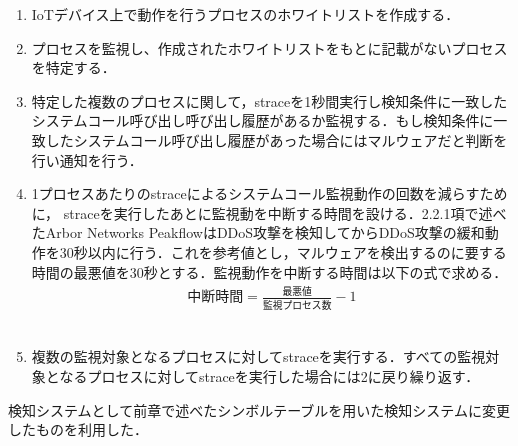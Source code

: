 \begin{enumerate}
 \item IoTデバイス上で動作を行うプロセスのホワイトリストを作成する．
 \item プロセスを監視し、作成されたホワイトリストをもとに記載がないプロセスを特定する．
 \item 特定した複数のプロセスに関して，straceを1秒間実行し検知条件に一致したシステムコール呼び出し呼び出し履歴があるか監視する．もし検知条件に一致したシステムコール呼び出し履歴があった場合にはマルウェアだと判断を行い通知を行う．
 
 \item 1プロセスあたりのstraceによるシステムコール監視動作の回数を減らすために，
 straceを実行したあとに監視動を中断する時間を設ける．2.2.1項で述べたArbor Networks PeakflowはDDoS攻撃を検知してからDDoS攻撃の緩和動作を30秒以内に行う．これを参考値とし，マルウェアを検出するのに要する時間の最悪値を30秒とする．監視動作を中断する時間は以下の式で求める．
 \begin{eqnarray}
 中断時間  =  \frac{最悪値}{監視プロセス数}-1
 \end{eqnarray}
　\item 複数の監視対象となるプロセスに対してstraceを実行する．すべての監視対象となるプロセスに対してstraceを実行した場合には2に戻り繰り返す．
 \end{enumerate}
 
 検知システムとして前章で述べたシンボルテーブルを用いた検知システムに変更したものを利用した．


 
 

